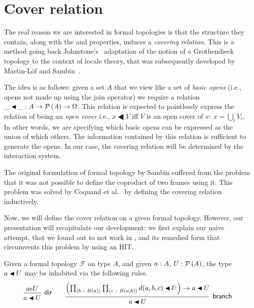 \section{Cover relation}

The real reason we are interested in formal topologies is that the structure they contain,
along with the \vermono{} and \versim{} properties, induces a \emph{covering relation}.
This is a method going back Johnstone's~\cite{stone-spaces} adaptation of the notion of a
Grothendieck topology to the context of locale theory, that was subsequently developed by
Martin-L\"{o}f and Sambin~\cite{int-formal-spaces}.

The idea is as follows: given a set $A$ that we view like a set of \emph{basic opens}
(i.e., opens not made up using the join operator) we require a relation $\_\LHD\_ : A \rightarrow
\pow{A} \rightarrow \Omega$. This relation is expected to pointlessly express the relation of being an
\emph{open cover} i.e., $x \LHD V$ iff $V$ is an open cover of $x$: $x = \bigcup_i V_i$. In
other words, we are specifying which basic opens can be expressed as the union of which
others. The information contained by this relation is sufficient to generate the opens.
In our case, the covering relation will be determined by the interaction system.

The original formulation of formal topology by Sambin suffered from the problem that it
was not possible to define the coproduct of two frames using it. This problem was solved
by Coquand et al.~\cite{coq-sambin} by defining the covering relation inductively.

Now, we will define the cover relation on a given formal topology. However, our
presentation will recapitulate our development: we first explain our naive attempt, that
we found out to not work in \UF{}, and its remedied form that circumvents this problem by
using an HIT.
\begin{defn}
  Given a formal topology
  $\mathcal{F}$ on type $A$, and given $a\hspace{0.1mm}:\hspace{0.1mm}A$, $U : \mathcal{P}\left(A\right)$, the type
  $\covers{a}{U}$ may be inhabited via the following rules.
  \[
  \begin{prooftree}
    \hypo{ a \epsilon U }
    \infer1[\textsf{dir}]{\covers{a}{U}}
  \end{prooftree}
  \qquad
  \begin{prooftree}
    \hypo{ \left(
      \pity{b}{B(a)}{
        \pity{c}{B(a, b)}{\covers{d(a, b, c)}{U}} \right) \rightarrow \covers{a}{U}
      }
    }
    \infer1[\textsf{branch}]{\covers{a}{U}}
  \end{prooftree}
  \]
\end{defn}

